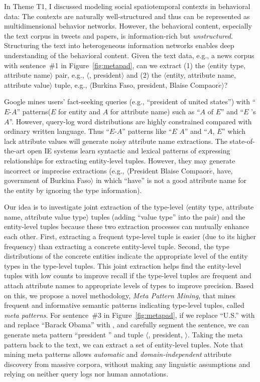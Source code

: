 \documentclass[10.5pt]{article}
\newcommand{\lb}{\mbox{$\langle$}}
\newcommand{\rb}{\mbox{$\rangle$}}
\newcommand{\pair}[2]{{\lb#1, #2\rb}\xspace}
\newcommand{\tuple}[3]{{\lb#1, #2, #3\rb}\xspace}
\newcommand{\eapatterns}{{``$E$-$A$'' patterns}\xspace}
\begin{document}
In Theme T1, I discussed modeling social spatiotemporal contexts in behavioral data: The contexts are naturally well-structured and thus can be represented as multidimensional behavior networks. However, the behavioral content, especially the text corpus in tweets and papers, is information-rich but \textit{unstructured}. Structuring the text into heterogeneous information networks enables deep understanding of the behavioral content. Given the text data, e.g., a news corpus with sentence~\#1 in Figure~\ref{fig:metapad}, can we extract (1) the \pair{entity type}{attribute name} pair, e.g., \pair{\cscountry}{president} and (2) the \tuple{entity}{attribute name}{attribute value} tuple, e.g., \tuple{Burkina Faso}{president}{Blaise Compaor$\acute{e}$}?

Google mines users' fact-seeking queries (e.g., ``president of united states'') with \eapatterns ($E$ for entity and $A$ for attribute name) such as ``$A$ of $E$'' and ``$E$ 's $A$''. However, query-log word distributions are highly constrained compared with ordinary written language. Thus \eapatterns like ``$E$ $A$'' and ``$A$, $E$'' which lack attribute values will generate noisy attribute name extractions. The state-of-the-art open IE systems learn syntactic and lexical patterns of expressing relationships for extracting entity-level tuples. However, they may generate incorrect or imprecise extractions (e.g., \tuple{President Blaise Compaor$\acute{e}$}{have}{government of Burkina Faso} in which ``have'' is not a good attribute name for the entity by ignoring the type information).

Our idea is to investigate joint extraction of the type-level \tuple{entity type}{attribute name}{attribute value type} tuples (adding ``value type'' into the pair) and the entity-level tuples because these two extraction processes can mutually enhance each other. First, extracting a frequent type-level tuple is easier (due to its higher frequency) than extracting a concrete entity-level tuple. Second, the type distributions of the concrete entities indicate the appropriate level of the entity types in the type-level tuples. This joint extraction helps find the entity-level tuples with low counts to improve recall if the type-level tuples are frequent and attach attribute names to appropriate levels of types to improve precision. Based on this, we propose a novel methodology, \textit{Meta Pattern Mining}, that mines frequent and informative semantic patterns indicating type-level tuples, called \textit{meta patterns}. For sentence~\#3 in Figure~\ref{fig:metapad}, if we replace ``U.S.'' with \cscountry and replace ``Barack Obama'' with \cspolitician, and carefully segment the sentence, we can generate meta pattern ``\cscountry president \cspolitician'' and tuple \tuple{\cscountry}{president}{\cspolitician}. Taking the meta pattern back to the text, we can extract a set of entity-level tuples. Note that mining meta patterns allows \textit{automatic} and \textit{domain-independent} attribute discovery from massive corpora, without making any linguistic assumptions and relying on neither query logs nor human annotations.
\end{document}
